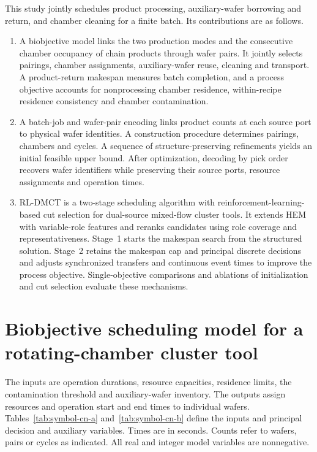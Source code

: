 \documentclass[preprint,12pt,nonatbib]{elsarticle}
\begin{document}
This study jointly schedules product processing, auxiliary-wafer borrowing and return, and chamber cleaning for a finite batch. Its contributions are as follows.
\begin{enumerate}[leftmargin=*]
\item A biobjective model links the two production modes and the consecutive chamber occupancy of chain products through wafer pairs. It jointly selects pairings, chamber assignments, auxiliary-wafer reuse, cleaning and transport. A product-return makespan measures batch completion, and a process objective accounts for nonprocessing chamber residence, within-recipe residence consistency and chamber contamination.
\item A batch-job and wafer-pair encoding links product counts at each source port to physical wafer identities. A construction procedure determines pairings, chambers and cycles. A sequence of structure-preserving refinements yields an initial feasible upper bound. After optimization, decoding by pick order recovers wafer identifiers while preserving their source ports, resource assignments and operation times.
\item RL-DMCT is a two-stage scheduling algorithm with reinforcement-learning-based cut selection for dual-source mixed-flow cluster tools. It extends HEM with variable-role features and reranks candidates using role coverage and representativeness. Stage~1 starts the makespan search from the structured solution. Stage~2 retains the makespan cap and principal discrete decisions and adjusts synchronized transfers and continuous event times to improve the process objective. Single-objective comparisons and ablations of initialization and cut selection evaluate these mechanisms.
\end{enumerate}


\FloatBarrier
\section{Biobjective scheduling model for a rotating-chamber cluster tool}
\setcounter{equation}{0}

The inputs are operation durations, resource capacities, residence limits, the contamination threshold and auxiliary-wafer inventory. The outputs assign resources and operation start and end times to individual wafers. Tables~\ref{tab:symbol-cn-a} and~\ref{tab:symbol-cn-b} define the inputs and principal decision and auxiliary variables. Times are in seconds. Counts refer to wafers, pairs or cycles as indicated. All real and integer model variables are nonnegative.
\end{document}
